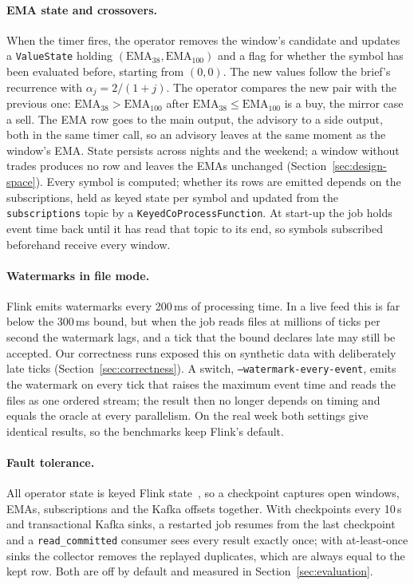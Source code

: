 \paragraph{EMA state and crossovers.}
When the timer fires, the operator removes the window's candidate and updates a \texttt{ValueState} holding
$(\mathrm{EMA}_{38}, \mathrm{EMA}_{100})$ and a flag for whether the symbol has been evaluated before, starting
from $(0, 0)$. The new values follow the brief's recurrence with $\alpha_j = 2/(1+j)$. The operator compares
the new pair with the previous one: $\mathrm{EMA}_{38} > \mathrm{EMA}_{100}$ after
$\mathrm{EMA}_{38} \le \mathrm{EMA}_{100}$ is a buy, the mirror case a sell. The EMA row goes to the main output,
the advisory to a side output, both in the same timer call, so an advisory leaves at the same moment as the
window's EMA. State persists across nights and the weekend; a window without trades produces no row and leaves
the EMAs unchanged (Section~\ref{sec:design-space}). Every symbol is computed; whether its rows are emitted
depends on the subscriptions, held as keyed state per symbol and updated from the \texttt{subscriptions}
topic by a \texttt{KeyedCoProcessFunction}. At start-up the job holds event time back until it has read that
topic to its end, so symbols subscribed beforehand receive every window.

\paragraph{Watermarks in file mode.}
Flink emits watermarks every 200\,ms of processing time. In a live feed this is far below the 300\,ms bound,
but when the job reads files at millions of ticks per second the watermark lags, and a tick that the bound
declares late may still be accepted. Our correctness runs exposed this on synthetic data with deliberately late
ticks (Section~\ref{sec:correctness}). A switch, \texttt{--watermark-every-event}, emits the watermark on every
tick that raises the maximum event time and reads the files as one ordered stream; the result then no longer
depends on timing and equals the oracle at every parallelism. On the real week both settings give identical
results, so the benchmarks keep Flink's default.

\paragraph{Fault tolerance.}
All operator state is keyed Flink state~\cite{carbone2017state}, so a checkpoint captures open windows, EMAs, subscriptions and the
Kafka offsets together. With checkpoints every 10\,s and transactional Kafka sinks, a restarted job resumes
from the last checkpoint and a \texttt{read\_committed} consumer sees every result exactly once; with
at-least-once sinks the collector removes the replayed duplicates, which are always equal to the kept row.
Both are off by default and measured in Section~\ref{sec:evaluation}.

